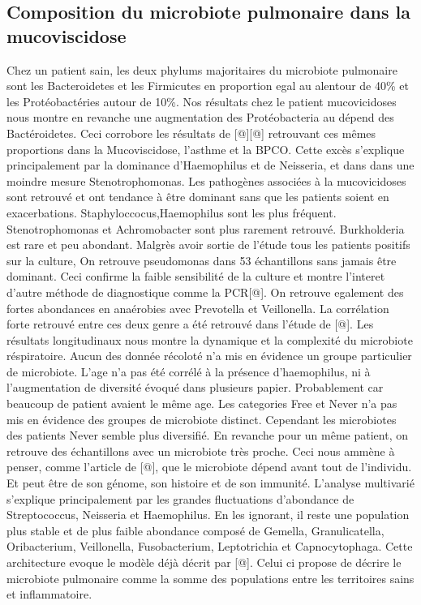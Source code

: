 \documentclass[12pt,a4paper]{article}
\begin{document}
\subsection{Composition du microbiote pulmonaire dans la mucoviscidose}
Chez un patient sain, les deux phylums majoritaires du microbiote pulmonaire sont les Bacteroidetes et les Firmicutes en proportion egal au alentour de 40\% et les Protéobactéries autour de 10\%. Nos résultats chez le patient mucovicidoses nous montre en revanche une augmentation des Protéobacteria au dépend des Bactéroidetes. Ceci corrobore les résultats de [@][@] retrouvant ces mêmes proportions dans la Mucoviscidose, l’asthme et la BPCO. Cette excès s’explique principalement par la dominance d’Haemophilus et de Neisseria, et dans dans une moindre mesure Stenotrophomonas.
Les pathogènes associées à la mucovicidoses sont retrouvé et ont tendance à être dominant sans que les patients soient en exacerbations. Staphyloccocus,Haemophilus sont les plus fréquent. Stenotrophomonas et Achromobacter sont plus rarement retrouvé. Burkholderia est rare et peu abondant.
Malgrès avoir sortie de l’étude tous les patients positifs sur la culture, On retrouve pseudomonas dans 53 échantillons sans jamais être dominant. Ceci confirme la faible sensibilité de la culture et montre l’interet d’autre méthode de diagnostique comme la PCR[@].
On retrouve egalement des fortes abondances en anaérobies avec Prevotella et Veillonella. La corrélation forte retrouvé entre ces deux genre a été retrouvé dans l’étude de [@].
Les résultats longitudinaux nous montre la dynamique et la complexité du microbiote réspiratoire. Aucun des donnée récoloté n’a mis en évidence un groupe particulier de microbiote. L’age n’a pas été corrélé à la présence d’haemophilus, ni à l’augmentation de diversité évoqué dans plusieurs papier. Probablement car beaucoup de patient avaient le même age. Les categories Free et Never n’a pas mis en évidence des groupes de microbiote distinct. Cependant les microbiotes des patients Never semble plus diversifié.
En revanche pour un même patient, on retrouve des échantillons avec un microbiote très proche. Ceci nous ammène à penser, comme l’article de [@], que le microbiote dépend avant tout de l’individu. Et peut être de son génome, son histoire et de son immunité.
L’analyse multivarié s’explique principalement par les grandes fluctuations d’abondance de Streptococcus, Neisseria et Haemophilus. En les ignorant, il reste une population plus stable et de plus faible abondance composé de Gemella, Granulicatella, Oribacterium, Veillonella, Fusobacterium, Leptotrichia et Capnocytophaga.
Cette architecture evoque le modèle déjà décrit par [@]. Celui ci propose de décrire le microbiote pulmonaire comme la somme des populations entre les territoires sains et inflammatoire.
\end{document}
